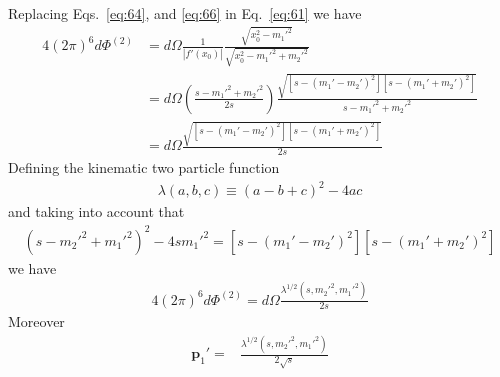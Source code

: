 Replacing Eqs.~\eqref{eq:64}, and \eqref{eq:66} in Eq.~\eqref{eq:61}
we have
\begin{align}
  \label{eq:67}
4(2\pi)^6d\Phi^{(2)}&=d\Omega\frac{1}{|f'(x_0)|}
\frac{\sqrt{x_0^2-{m_1'}^2}}{\sqrt{x_0^2-{m_1'}^2+{m_2'}^2}}\nonumber\\
  &=d\Omega\left(\frac{s-{m_1'}^2+{m_2'}^2}{2s}\right)
\frac{\sqrt{[s-({m_1'}-{m_2'})^2][s-({m_1'}+{m_2'})^2]}}{s-{m_1'}^2+{m_2'}^2}\nonumber\\
&=d\Omega\frac{\sqrt{[s-({m_1'}-{m_2'})^2][s-({m_1'}+{m_2'})^2]}}{2s}
\end{align}
Defining the kinematic two particle function
\begin{align}
  \label{eq:46}
  \lambda(a,b,c)\equiv(a-b+c)^2-4ac
\end{align}
and taking into account that
\begin{align}
  \left(s-{m_2'}^2+{m_1'}^2\right)^2-4s{m_1'}^2=[s-({m_1'}-{m_2'})^2][s-({m_1'}+{m_2'})^2]
\end{align}
we have
\begin{align}
\label{eq:150}
  4(2\pi)^6d\Phi^{(2)}=d\Omega\frac{\lambda^{1/2}(s,{m_2'}^2,{m_1'}^2)}{2s}
\end{align}
Moreover
\begin{align}
  \label{eq:151}
  \mathbf{p}_1'=&\frac{\lambda^{1/2}(s,{m_2'}^2,{m_1'}^2)}{2\sqrt{s}}
\end{align}

